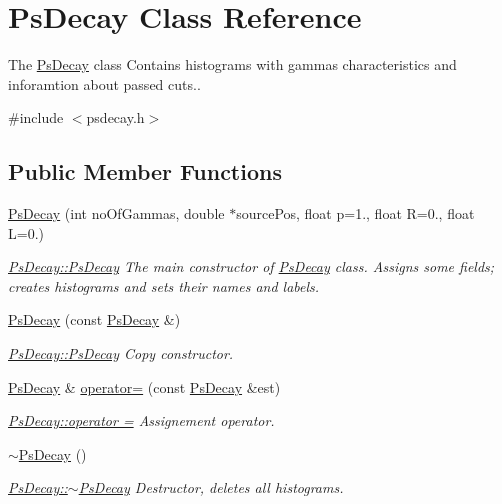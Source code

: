 \hypertarget{classPsDecay}{}\section{Ps\+Decay Class Reference}
\label{classPsDecay}


The \hyperlink{classPsDecay}{Ps\+Decay} class Contains histograms with gammas\textquotesingle{} characteristics and inforamtion about passed cuts..  




{\ttfamily \#include $<$psdecay.\+h$>$}

\subsection*{Public Member Functions}
\begin{DoxyCompactItemize}
\item 
\hyperlink{classPsDecay_a138b7f62cfe2e4c673db5409abdf153d}{Ps\+Decay} (int no\+Of\+Gammas, double $\ast$source\+Pos, float p=1., float R=0., float L=0.)
\begin{DoxyCompactList}\small\item\em \hyperlink{classPsDecay_a138b7f62cfe2e4c673db5409abdf153d}{Ps\+Decay\+::\+Ps\+Decay} The main constructor of \hyperlink{classPsDecay}{Ps\+Decay} class. Assigns some fields; creates histograms and sets their names and labels. \end{DoxyCompactList}\item 
\hyperlink{classPsDecay_a572b4252d8fee9cf74912bc5028aacdd}{Ps\+Decay} (const \hyperlink{classPsDecay}{Ps\+Decay} \&)
\begin{DoxyCompactList}\small\item\em \hyperlink{classPsDecay_a138b7f62cfe2e4c673db5409abdf153d}{Ps\+Decay\+::\+Ps\+Decay} Copy constructor. \end{DoxyCompactList}\item 
\hyperlink{classPsDecay}{Ps\+Decay} \& \hyperlink{classPsDecay_a90bd9f4ce937cc828fef2bcf254005a9}{operator=} (const \hyperlink{classPsDecay}{Ps\+Decay} \&est)
\begin{DoxyCompactList}\small\item\em \hyperlink{classPsDecay_a90bd9f4ce937cc828fef2bcf254005a9}{Ps\+Decay\+::operator =} Assignement operator. \end{DoxyCompactList}\item 
\hyperlink{classPsDecay_a18464d58ecac1d13983a170a86b37910}{$\sim$\+Ps\+Decay} ()
\begin{DoxyCompactList}\small\item\em \hyperlink{classPsDecay_a18464d58ecac1d13983a170a86b37910}{Ps\+Decay\+::$\sim$\+Ps\+Decay} Destructor, deletes all histograms. \end{DoxyCompactList}\item 

\end{DoxyCompactItemize}
